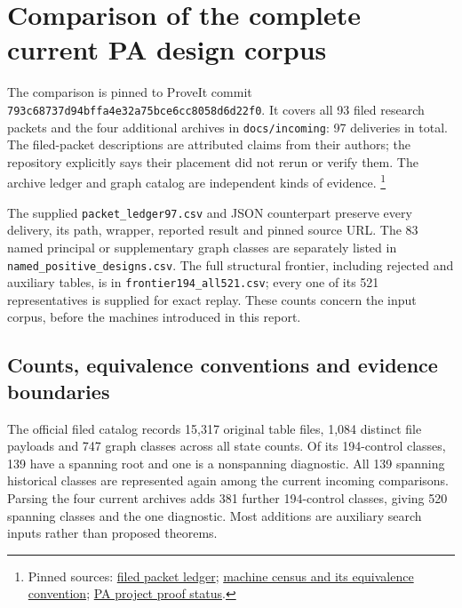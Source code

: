 \section{Comparison of the complete current PA design corpus}
\label{sec:corpus-comparison}

The comparison is pinned to ProveIt commit
\nolinkurl{793c68737d94bffa4e32a75bce6cc8058d6d22f0}.
It covers all 93 filed research packets and the four additional archives in
\texttt{docs/incoming}: 97 deliveries in total.
The filed-packet descriptions are attributed claims from their authors;
the repository explicitly says their placement did not rerun or verify them.
The archive ledger and graph catalog are independent kinds of evidence.
\footnote{Pinned sources: \href{https://github.com/VladimirReshetnikov/ProveIt/blob/793c68737d94bffa4e32a75bce6cc8058d6d22f0/Computability/BusyBeaver/Research/PA/docs/README.md}{filed packet ledger}; \href{https://github.com/VladimirReshetnikov/ProveIt/blob/793c68737d94bffa4e32a75bce6cc8058d6d22f0/Computability/BusyBeaver/Research/PA/docs/MACHINES.md}{machine census and its equivalence convention}; \href{https://github.com/VladimirReshetnikov/ProveIt/blob/793c68737d94bffa4e32a75bce6cc8058d6d22f0/Computability/BusyBeaver/Research/PA/README.md}{PA project proof status}.}

The supplied \texttt{packet\_ledger97.csv} and JSON counterpart preserve every
delivery, its path, wrapper, reported result and pinned source URL.
The 83 named principal or supplementary graph classes are separately listed
in \texttt{named\_positive\_designs.csv}.  The full structural frontier,
including rejected and auxiliary tables, is in
\texttt{frontier194\_all521.csv}; every one of its 521 representatives is
supplied for exact replay.  These counts concern the input corpus, before
the machines introduced in this report.

\subsection{Counts, equivalence conventions and evidence boundaries}

The official filed catalog records 15,317 original table files, 1,084 distinct
file payloads and 747 graph classes across all state counts.  Of its 194-control
classes, 139 have a spanning root and one is a nonspanning diagnostic.
All 139 spanning historical classes are represented again among the current
incoming comparisons.  Parsing the four current archives adds 381 further
194-control classes, giving 520 spanning classes and the one diagnostic.
Most additions are auxiliary search inputs rather than proposed theorems.

